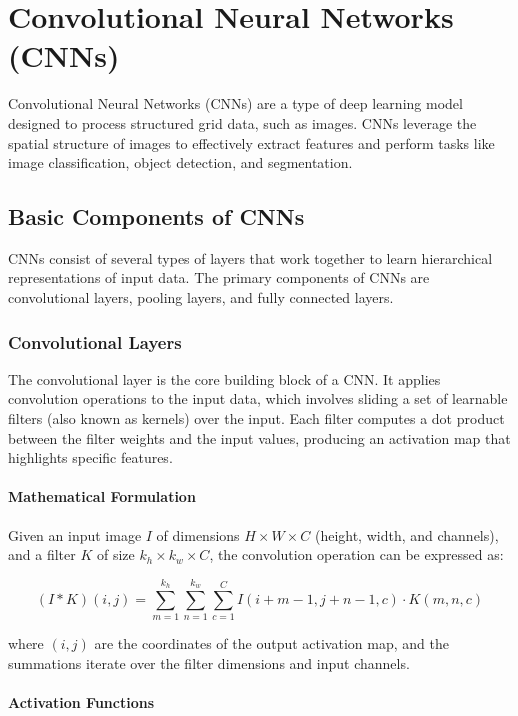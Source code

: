 \documentclass[12pt]{article}
\begin{document}
\section{Convolutional Neural Networks (CNNs)}

Convolutional Neural Networks (CNNs) are a type of deep learning model designed to process structured grid data, such as images. CNNs leverage the spatial structure of images to effectively extract features and perform tasks like image classification, object detection, and segmentation.

\subsection{Basic Components of CNNs}

CNNs consist of several types of layers that work together to learn hierarchical representations of input data. The primary components of CNNs are convolutional layers, pooling layers, and fully connected layers.

\subsubsection{Convolutional Layers}

The convolutional layer is the core building block of a CNN. It applies convolution operations to the input data, which involves sliding a set of learnable filters (also known as kernels) over the input. Each filter computes a dot product between the filter weights and the input values, producing an activation map that highlights specific features.

\paragraph{Mathematical Formulation}

Given an input image \( I \) of dimensions \( H \times W \times C \) (height, width, and channels), and a filter \( K \) of size \( k_h \times k_w \times C \), the convolution operation can be expressed as:

\[
(I * K)(i, j) = \sum_{m=1}^{k_h} \sum_{n=1}^{k_w} \sum_{c=1}^{C} I(i+m-1, j+n-1, c) \cdot K(m, n, c)
\]

where \((i, j)\) are the coordinates of the output activation map, and the summations iterate over the filter dimensions and input channels.

\paragraph{Activation Functions}
\end{document}
